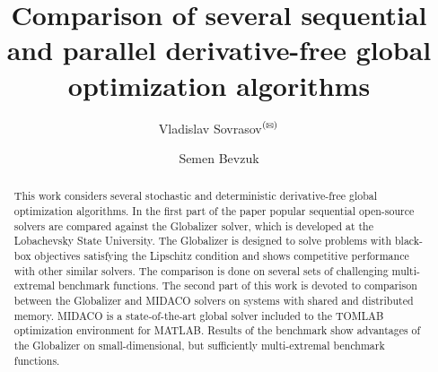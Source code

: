 \documentclass{svproc}
\def\letter{$^{\textrm{(\Letter)}}$}
\begin{document}
\mainmatter              %
%
\title{Comparison of several sequential and parallel derivative-free global optimization algorithms}
%
%
\author{Vladislav Sovrasov\letter \and Semen Bevzuk}
%
%
%

\maketitle              %

\begin{abstract}
This work considers several stochastic and deterministic derivative-free global optimization algorithms. In the first part of the paper popular sequential open-source solvers are compared against the Globalizer solver, which is developed at the Lobachevsky State University. The Globalizer is designed to solve problems with black-box objectives satisfying the Lipschitz condition and shows competitive performance with other similar solvers. The comparison is done on several sets of challenging multi-extremal benchmark functions. The second part of this work is devoted to comparison between the Globalizer and MIDACO solvers on systems with shared and distributed memory. MIDACO is a state-of-the-art global solver included to the TOMLAB optimization environment for MATLAB. Results of the benchmark show advantages of the Globalizer on small-dimensional, but sufficiently multi-extremal benchmark functions.
\end{abstract}
%
\end{document}
